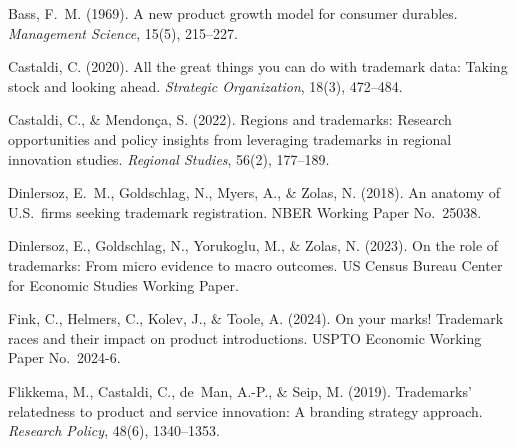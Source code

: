 
Bass, F.~M. (1969). A new product growth model for consumer durables.
\emph{Management Science}, 15(5), 215--227.

Castaldi, C. (2020). All the great things you can do with trademark data:
Taking stock and looking ahead. \emph{Strategic Organization}, 18(3),
472--484.

Castaldi, C., \& Mendon\c{c}a, S. (2022). Regions and trademarks: Research
opportunities and policy insights from leveraging trademarks in regional
innovation studies. \emph{Regional Studies}, 56(2), 177--189.

Dinlersoz, E.~M., Goldschlag, N., Myers, A., \& Zolas, N. (2018). An
anatomy of U.S.\ firms seeking trademark registration. NBER Working Paper
No.\ 25038.

Dinlersoz, E., Goldschlag, N., Yorukoglu, M., \& Zolas, N. (2023). On the
role of trademarks: From micro evidence to macro outcomes. US Census
Bureau Center for Economic Studies Working Paper.


Fink, C., Helmers, C., Kolev, J., \& Toole, A. (2024). On your marks!
Trademark races and their impact on product introductions. USPTO Economic
Working Paper No.\ 2024-6.

Flikkema, M., Castaldi, C., de~Man, A.-P., \& Seip, M. (2019). Trademarks'
relatedness to product and service innovation: A branding strategy
approach. \emph{Research Policy}, 48(6), 1340--1353.

